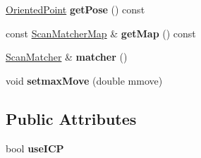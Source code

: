 \begin{DoxyCompactItemize}
\hyperlink{structGMapping_1_1orientedpoint}{Oriented\+Point} {\bfseries get\+Pose} () const
\item 
\mbox{\label{classGMapping_1_1ScanMatcherProcessor_af830b662331e6c107793be743471626d}} 
const \hyperlink{classGMapping_1_1Map}{Scan\+Matcher\+Map} \& {\bfseries get\+Map} () const
\item 
\mbox{\label{classGMapping_1_1ScanMatcherProcessor_a8691dc48e2a1e95dd6b8c711ae993455}} 
\hyperlink{classGMapping_1_1ScanMatcher}{Scan\+Matcher} \& {\bfseries matcher} ()
\item 
\mbox{\label{classGMapping_1_1ScanMatcherProcessor_aa9ae71b27f1747f7690ee5760aea7e7c}} 
void {\bfseries setmax\+Move} (double mmove)
\end{DoxyCompactItemize}
\subsection*{Public Attributes}
\begin{DoxyCompactItemize}
\item 
\mbox{\label{classGMapping_1_1ScanMatcherProcessor_a4d4996cd28dc31eddacada30703edc61}} 
bool {\bfseries use\+I\+CP}
\end{DoxyCompactItemize}
